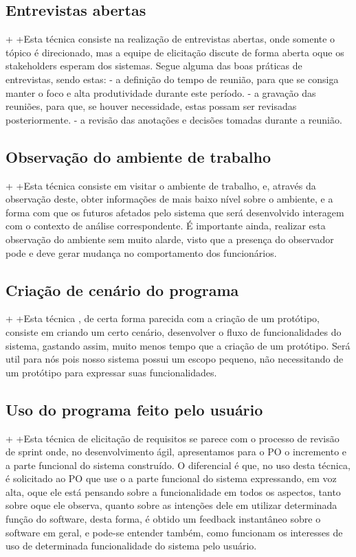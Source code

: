   \subsection{Entrevistas abertas}
  +
  +Esta técnica consiste na realização de entrevistas abertas, onde somente o tópico é direcionado, mas a equipe de elicitação
  discute de forma aberta oque os stakeholders esperam dos sistemas. Segue alguma das boas práticas de entrevistas, sendo estas:
  - a definição do tempo de reunião, para que se consiga manter o foco
  e alta produtividade durante este período.
   - a gravação das reuniões, para que, se houver necessidade, estas possam ser revisadas posteriormente.
  - a revisão das anotações e decisões tomadas durante a reunião.
  
  \subsection{Observação do ambiente de trabalho}
  +
  +Esta técnica consiste em visitar o ambiente de trabalho, e, através da observação deste, obter informações de
  mais baixo nível sobre o ambiente, e a forma com que os futuros afetados pelo sistema que será desenvolvido interagem
  com o contexto de análise correspondente. É importante ainda, realizar esta observação do ambiente sem muito alarde,
  visto que a presença do observador pode e deve gerar mudança no comportamento dos funcionários.
  
  \subsection{Criação de cenário do programa}
  +
  +Esta técnica , de certa forma parecida com  a criação de um protótipo, consiste em criando um certo cenário,
  desenvolver o fluxo de funcionalidades do sistema, gastando assim, muito menos tempo que a criação de um protótipo.
  Será util para nós pois nosso sistema possui um escopo pequeno, não necessitando de um protótipo para expressar 
  suas funcionalidades.
  
  \subsection{Uso do programa feito pelo usuário}
  +
  +Esta técnica de elicitação de requisitos se parece com o processo de revisão de sprint
  onde, no desenvolvimento ágil, apresentamos para o PO o incremento e a parte funcional do sistema construído.
  O diferencial é que, no uso desta técnica, é solicitado ao PO que use o a parte funcional do sistema expressando, 
  em voz alta, oque ele está pensando sobre a funcionalidade em todos os aspectos, tanto sobre oque ele observa, quanto
  sobre as intenções dele em utilizar determinada função do software, desta forma, é obtido um feedback
  instantâneo sobre o software em geral, e pode-se entender também, 
  como funcionam os interesses de uso de determinada funcionalidade
  do sistema pelo usuário.
